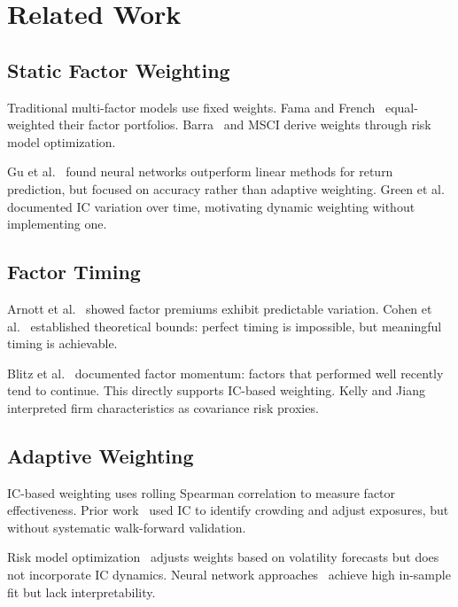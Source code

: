 \section{Related Work}
\label{sec:related}

\subsection{Static Factor Weighting}

Traditional multi-factor models use fixed weights. Fama and French~\cite{fama1993} equal-weighted their factor portfolios. Barra~\cite{rosenberg1974} and MSCI derive weights through risk model optimization.

Gu et al.~\cite{gu2020} found neural networks outperform linear methods for return prediction, but focused on accuracy rather than adaptive weighting. Green et al.~\cite{green2017} documented IC variation over time, motivating dynamic weighting without implementing one.

\subsection{Factor Timing}

Arnott et al.~\cite{arnott2016timing} showed factor premiums exhibit predictable variation. Cohen et al.~\cite{cohen2020bounds} established theoretical bounds: perfect timing is impossible, but meaningful timing is achievable.

Blitz et al.~\cite{blitz2020factormomentum} documented factor momentum: factors that performed well recently tend to continue. This directly supports IC-based weighting. Kelly and Jiang~\cite{kelly2023characteristics} interpreted firm characteristics as covariance risk proxies.

\subsection{Adaptive Weighting}

IC-based weighting uses rolling Spearman correlation to measure factor effectiveness. Prior work~\cite{qian2015,grinold2000} used IC to identify crowding and adjust exposures, but without systematic walk-forward validation.

Risk model optimization~\cite{clarke2016} adjusts weights based on volatility forecasts but does not incorporate IC dynamics. Neural network approaches~\cite{gu2020} achieve high in-sample fit but lack interpretability.

